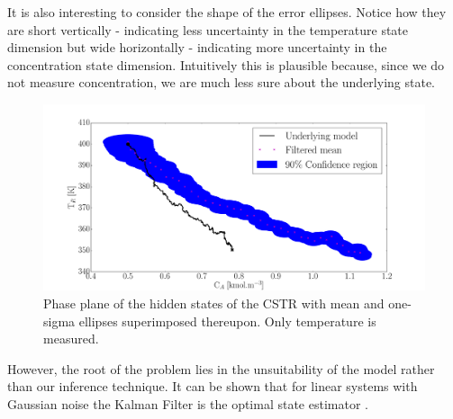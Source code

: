 \documentclass[../masters.tex]{subfiles}
\begin{document}
It is also interesting to consider the shape of the error ellipses. Notice how they are short vertically - indicating less uncertainty in the temperature state dimension but wide horizontally - indicating more uncertainty in the concentration state dimension. Intuitively this is plausible because, since we do not measure concentration, we are much less sure about the underlying state. 
\begin{figure}[H] 
\centering
\includegraphics[scale=0.30]{kalman_filter_phase_M1.pdf}
\caption{Phase plane of the hidden states of the CSTR with mean and one-sigma ellipses superimposed thereupon. Only temperature is measured.}
\label{fig_kfphase}
\end{figure}
However, the root of the problem lies in the unsuitability of the model rather than our inference technique. It can be shown that for linear systems with Gaussian noise the Kalman Filter is the optimal state estimator \cite{shalom}. 
\end{document}
